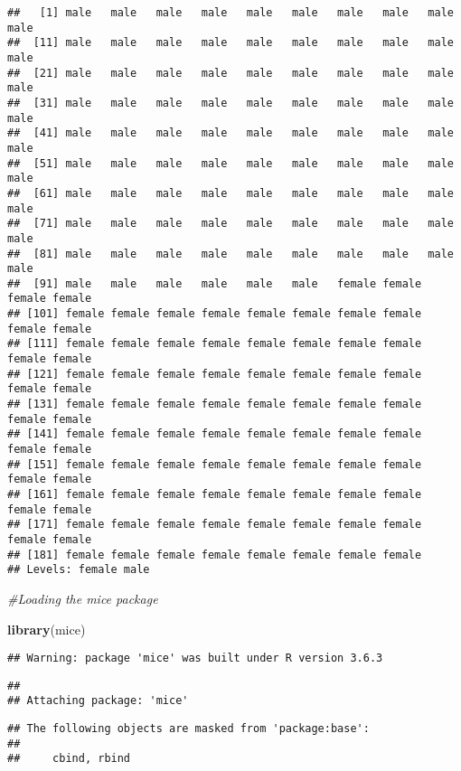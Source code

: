 \documentclass[
]{article}
\newenvironment{Shaded}{\begin{snugshade}}{\end{snugshade}}
\newcommand{\CommentTok}[1]{\textcolor[rgb]{0.56,0.35,0.01}{\textit{#1}}}
\newcommand{\KeywordTok}[1]{\textcolor[rgb]{0.13,0.29,0.53}{\textbf{#1}}}
\newcommand{\NormalTok}[1]{#1}
\begin{document}
\begin{verbatim}
##   [1] male   male   male   male   male   male   male   male   male   male  
##  [11] male   male   male   male   male   male   male   male   male   male  
##  [21] male   male   male   male   male   male   male   male   male   male  
##  [31] male   male   male   male   male   male   male   male   male   male  
##  [41] male   male   male   male   male   male   male   male   male   male  
##  [51] male   male   male   male   male   male   male   male   male   male  
##  [61] male   male   male   male   male   male   male   male   male   male  
##  [71] male   male   male   male   male   male   male   male   male   male  
##  [81] male   male   male   male   male   male   male   male   male   male  
##  [91] male   male   male   male   male   male   female female female female
## [101] female female female female female female female female female female
## [111] female female female female female female female female female female
## [121] female female female female female female female female female female
## [131] female female female female female female female female female female
## [141] female female female female female female female female female female
## [151] female female female female female female female female female female
## [161] female female female female female female female female female female
## [171] female female female female female female female female female female
## [181] female female female female female female female female
## Levels: female male
\end{verbatim}

\begin{Shaded}
\begin{Highlighting}[]
\CommentTok{#Loading the mice package}

\KeywordTok{library}\NormalTok{(mice)}
\end{Highlighting}
\end{Shaded}

\begin{verbatim}
## Warning: package 'mice' was built under R version 3.6.3
\end{verbatim}

\begin{verbatim}
## 
## Attaching package: 'mice'
\end{verbatim}

\begin{verbatim}
## The following objects are masked from 'package:base':
## 
##     cbind, rbind
\end{verbatim}
\end{document}
